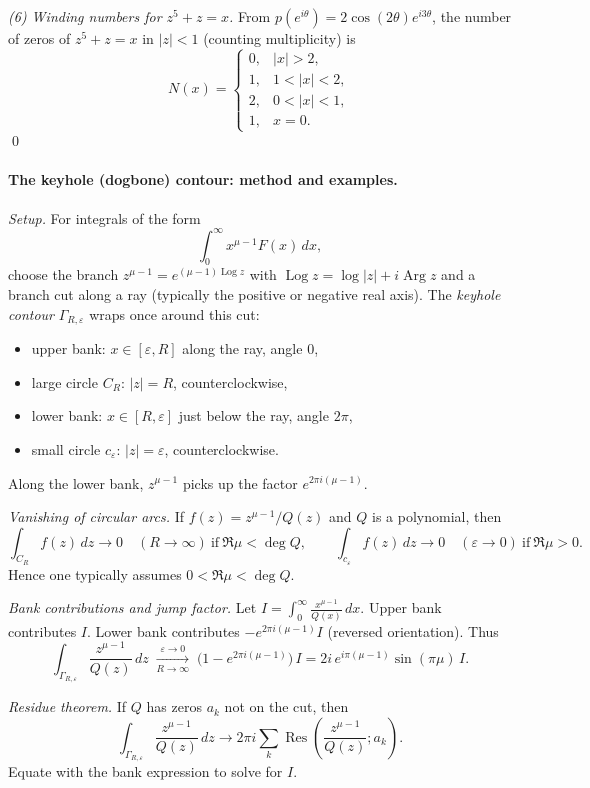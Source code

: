 \documentclass[11pt,a4paper]{article}
\theoremstyle{definition}
\theoremstyle{definition}
\theoremstyle{plain}
\theoremstyle{remark}
\DeclareMathOperator{\Log}{Log}
\DeclareMathOperator{\Arg}{Arg}
\DeclareMathOperator{\Res}{Res}
\begin{document}
\smallskip
\emph{(6) Winding numbers for $z^5+z=x$.}
From $p(e^{i\theta})=2\cos(2\theta)e^{i3\theta}$, the number of zeros of $z^5+z=x$ in $|z|<1$ (counting multiplicity) is
\[
N(x)=
\begin{cases}
	0, & |x|>2,\\
	1, & 1<|x|<2,\\
	2, & 0<|x|<1,\\
	1, & x=0.
\end{cases}
\]
\qed

	
\paragraph{The keyhole (dogbone) contour: method and examples.}

\emph{Setup.}
For integrals of the form
\[
\int_{0}^{\infty} x^{\mu-1} F(x)\,dx,
\]
choose the branch $z^{\mu-1}=e^{(\mu-1)\Log z}$ with $\Log z=\log|z|+i\Arg z$ and a branch cut along a ray (typically the positive or negative real axis). The \emph{keyhole contour} $\Gamma_{R,\varepsilon}$ wraps once around this cut:
\begin{itemize}
	\item upper bank: $x\in[\varepsilon,R]$ along the ray, angle $0$,
	\item large circle $C_R$: $|z|=R$, counterclockwise,
	\item lower bank: $x\in[R,\varepsilon]$ just below the ray, angle $2\pi$,
	\item small circle $c_\varepsilon$: $|z|=\varepsilon$, counterclockwise.
\end{itemize}
Along the lower bank, $z^{\mu-1}$ picks up the factor $e^{2\pi i(\mu-1)}$.

\medskip
\emph{Vanishing of circular arcs.}
If $f(z)=z^{\mu-1}/Q(z)$ and $Q$ is a polynomial, then
\[
\int_{C_R} f(z)\,dz \to 0 \quad (R\to\infty) \ \text{if}\ \Re\mu<\deg Q,
\qquad
\int_{c_\varepsilon} f(z)\,dz \to 0 \quad (\varepsilon\to0) \ \text{if}\ \Re\mu>0.
\]
Hence one typically assumes $0<\Re\mu<\deg Q$.

\medskip
\emph{Bank contributions and jump factor.}
Let $I=\displaystyle\int_{0}^{\infty}\frac{x^{\mu-1}}{Q(x)}\,dx$.
Upper bank contributes $I$. Lower bank contributes $-e^{2\pi i(\mu-1)} I$ (reversed orientation).
Thus
\[
\int_{\Gamma_{R,\varepsilon}} \frac{z^{\mu-1}}{Q(z)}\,dz
\;\xrightarrow[R\to\infty]{\varepsilon\to0}\;
\bigl(1-e^{2\pi i(\mu-1)}\bigr)\,I
=2i\,e^{i\pi(\mu-1)}\sin(\pi\mu)\,I.
\]

\medskip
\emph{Residue theorem.}
If $Q$ has zeros $a_k$ not on the cut, then
\[
\int_{\Gamma_{R,\varepsilon}} \frac{z^{\mu-1}}{Q(z)}\,dz
\to 2\pi i \sum_k \Res\!\left(\frac{z^{\mu-1}}{Q(z)}; a_k\right).
\]
Equate with the bank expression to solve for $I$.
\end{document}

